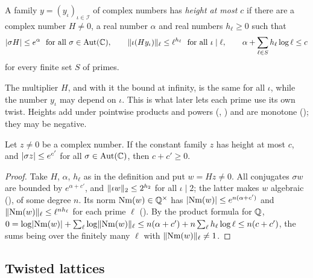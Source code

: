 \begin{definition}\label{setup:def:height}
A family $y = (y_\iota)_{\iota \in \mathcal{I}}$ of complex numbers has \emph{height at most $c$}
if there are a complex number $H \ne 0$, a real number $\alpha$ and real numbers $h_\ell \ge 0$
such that
\[
  \abs{\sigma H} \le e^{\alpha} \ \text{ for all } \sigma \in \Aut(\C), \qquad
  \norm{\iota(H y_\iota)}_\ell \le \ell^{h_\ell} \ \text{ for all } \iota \mid \ell, \qquad
  \alpha + \sum_{\ell \in S} h_\ell \log \ell \le c
\]
for every finite set $S$ of primes.
\end{definition}

The multiplier $H$, and with it the bound at infinity, is the same for all $\iota$, while the
number $y_\iota$ may depend on $\iota$. This is what later lets each prime use its own twist.
Heights add under pointwise products and powers (, )
and are monotone (); they may be negative.

\begin{lemma}\label{setup:lem:product}
Let $z \ne 0$ be a complex number. If the constant family $z$ has height at most $c$, and
$\lvert\sigma z\rvert \le e^{c'}$ for all $\sigma \in \operatorname{Aut}(\mathbb{C})$, then $c + c' \ge 0$.
\end{lemma}

\begin{proof}
Take $H$, $\alpha$, $h_\ell$ as in the definition and put $w = Hz \ne 0$. All conjugates
$\sigma w$ are bounded by $e^{\alpha + c'}$, and $\lVert\iota w\rVert_2 \le 2^{h_2}$ for all $\iota \mid 2$;
the latter makes $w$ algebraic (), of some degree
$n$. Its norm
$\operatorname{Nm}(w) \in \mathbb{Q}^\times$ has $\lvert\operatorname{Nm}(w)\rvert \le e^{n(\alpha + c')}$ and
$\lVert\operatorname{Nm}(w)\rVert_\ell \le \ell^{n h_\ell}$ for each prime $\ell$
(). By the product formula for $\mathbb{Q}$,
$0 = \log\lvert\operatorname{Nm}(w)\rvert + \sum_\ell \log\lVert\operatorname{Nm}(w)\rVert_\ell \le n(\alpha + c') + n\sum_\ell h_\ell\log\ell
\le n(c + c')$, the sums being over the finitely many $\ell$ with $\lVert\operatorname{Nm}(w)\rVert_\ell \ne 1$.
\end{proof}

\subsection{Twisted lattices}

